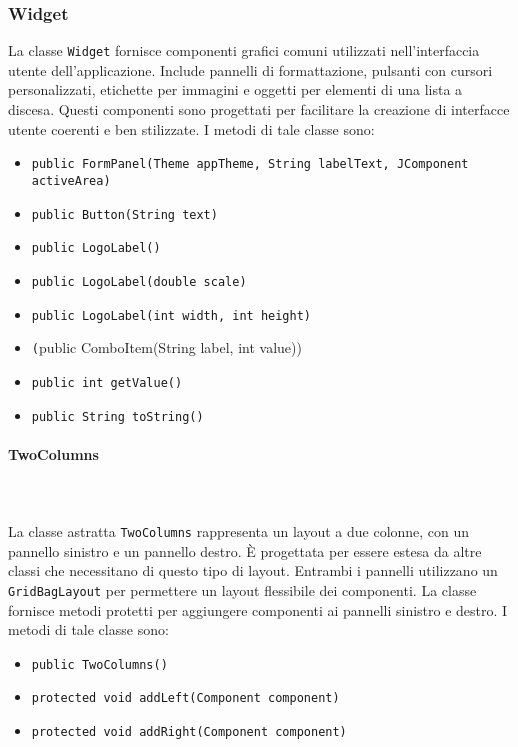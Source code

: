 \subsubsection {Widget}
La classe \texttt{Widget} fornisce componenti grafici comuni utilizzati nell'interfaccia utente dell'applicazione.
Include pannelli di formattazione, pulsanti con cursori personalizzati, etichette per immagini e oggetti per elementi di una lista a discesa. 
Questi componenti sono progettati per facilitare la creazione di interfacce utente coerenti e ben stilizzate.
I metodi di tale classe sono:
\begin{itemize}
    \item \texttt{public FormPanel(Theme appTheme, String labelText, JComponent activeArea)}
    \item \texttt{public Button(String text)}
    \item \texttt{public LogoLabel()}
    \item \texttt{public LogoLabel(double scale)}
    \item \texttt{public LogoLabel(int width, int height)}
    \item \texttt(public ComboItem(String label, int value))
    \item \texttt{public int getValue()}
    \item \texttt{public String toString()}
\end{itemize}

\paragraph{TwoColumns}\\
\\
La classe astratta \texttt{TwoColumns} rappresenta un layout a due colonne, con un pannello sinistro e un pannello destro. È progettata per essere estesa da altre classi che necessitano di questo tipo di layout.
Entrambi i pannelli utilizzano un \texttt{GridBagLayout} per permettere un layout flessibile dei componenti.
La classe fornisce metodi protetti per aggiungere componenti ai pannelli sinistro e destro.
I metodi di tale classe sono:
\begin{itemize}
    \item \texttt{public TwoColumns()}
    \item \texttt{protected void addLeft(Component component)}
    \item \texttt{protected void addRight(Component component)}
\end{itemize}

